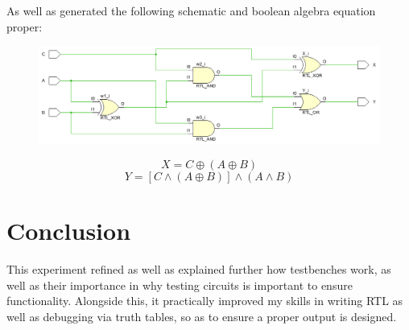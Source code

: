 As well as generated the following schematic and boolean algebra equation proper:
\begin{figure}[!htbp]
    \centering
    \caption{}
    \includegraphics[width=1\textwidth]{part-4-schem.png}
\end{figure}\newline
$$ X = C \oplus (A \oplus B) $$
$$ Y = [C \land (A \oplus B)] \land (A \land B) $$
\newline
\section{Conclusion}
This experiment refined as well as explained further how testbenches work, as well as their importance in why testing circuits is important to ensure functionality. Alongside this, it practically improved my skills in writing RTL as well as debugging via truth tables, so as to ensure a proper output is designed.

